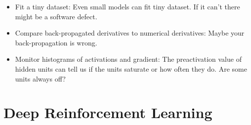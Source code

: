 \begin{itemize}
\begin{itemize}[noitemsep,nolistsep]
		\item Fit a tiny dataset: Even small models can fit tiny dataset. If it can't there might be a software defect.
		\item Compare back-propagated derivatives to numerical derivatives: Maybe your back-propagation is wrong.
		\item Monitor histograms of activations and gradient: The preactivation value of hidden units can tell us if the units saturate or how often they do. Are some units always off? 
	\end{itemize}
\end{itemize}

\section{Deep Reinforcement Learning}
